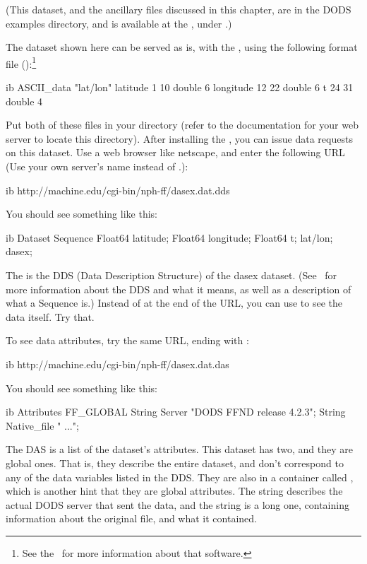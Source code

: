 (This dataset, and the ancillary files discussed in this chapter, are
in the DODS examples directory, and is available at the \DODSexamples ,
under .)

The dataset shown here can be served as is, with the \DODSffs , using
the following format file ():\footnote{See the
  \DODSffbook\ for more information about that software.}

\begin{vcode}{ib}
ASCII_data "lat/lon"
latitude 1 10 double 6
longitude 12 22 double 6
t 24 31 double 4
\end{vcode}

Put both of these files in your  directory (refer to the
documentation for your web server to locate this directory).  After
installing the \DODSffs , you can issue data requests on this
dataset.  Use a web browser like netscape, and enter the following
URL (Use your own server's name instead of .):

\begin{vcode}{ib}
http://machine.edu/cgi-bin/nph-ff/dasex.dat.dds
\end{vcode}

You should see something like this:

\begin{vcode}{ib}
Dataset {
    Sequence {
        Float64 latitude;
        Float64 longitude;
        Float64 t;
    } lat/lon;
} dasex;
\end{vcode}

The is the DDS (Data Description Structure) of the dasex dataset.  (See
\DODSuser\ for more information about the DDS and what it means, as
well as a description of what a Sequence is.)  Instead of  at
the end of the URL, you can use  to see the data itself.
Try that.  

To see data attributes, try the same URL, ending with :

\begin{vcode}{ib}
http://machine.edu/cgi-bin/nph-ff/dasex.dat.das
\end{vcode}

You should see something like this:

\begin{vcode}{ib}
Attributes {
 FF_GLOBAL {
   String Server "DODS FFND release 4.2.3";
   String Native_file " ...";
    }
}
\end{vcode}

The DAS is a list of the dataset's attributes.  This dataset has two,
and they are global ones.  That is, they describe the entire dataset,
and don't correspond to any of the data variables listed in the DDS.
They are also in a container called , which is another
hint that they are global attributes.  The  string
describes the actual DODS server that sent the data, and the
 string is a long one, containing information about
the original file, and what it contained.

